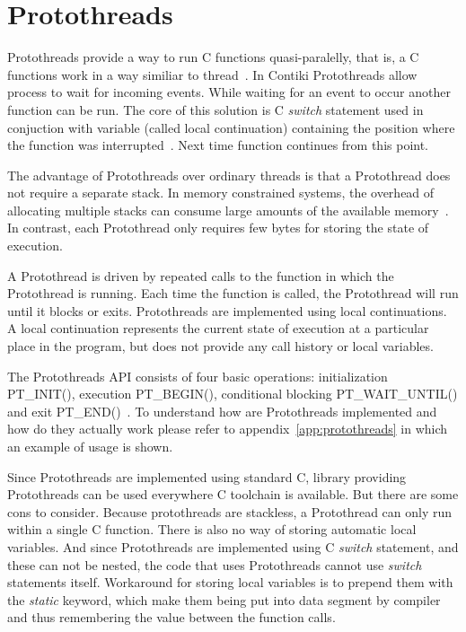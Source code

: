 
\section{Protothreads}\label{sec:contiki-protothreads}
Protothreads provide a way to run C functions quasi-paralelly,
that is, a C functions work in a way similiar to thread~\cite{paper-protothreads}.
In Contiki Protothreads allow process to wait for incoming events.
While waiting for an event to occur another function
can be run. The core of this solution is C {\it switch} statement used in conjuction with variable (called local continuation)
containing the position where the function was interrupted~\cite{paper-protothreads}.
Next time function continues from this point.

The advantage of Protothreads over ordinary threads is that a Protothread does not require a separate stack.
In memory constrained systems, the overhead of allocating multiple stacks can consume large amounts of
the available memory~\cite{paper-protothreads}.
In contrast, each Protothread only requires few bytes for storing the state of execution.

A Protothread is driven by repeated calls to the function in which the Protothread is running.
Each time the
function is called, the Protothread will run until it blocks or exits.
Protothreads are implemented using local continuations. A local continuation represents the current state
of execution at a particular place in the program, but does not provide any call history or local variables.

The Protothreads API consists of four basic operations: initialization PT\_INIT(), execution PT\_BEGIN(),
conditional blocking PT\_WAIT\_UNTIL() and exit PT\_END()~\cite{paper-protothreads}.
To understand how are Protothreads implemented and how do they actually work please refer
to appendix~\ref{app:protothreads} in which an example of usage is shown.

Since Protothreads are implemented using standard C, library providing Protothreads can be used everywhere C toolchain is available.
But there are some cons to consider. Because protothreads are stackless, a Protothread can only run within a single C function.
There is also no way of storing automatic local variables. And since Protothreads are implemented using C {\it switch} statement, and these can
not be nested, the code that uses Protothreads cannot use {\it switch} statements itself.
Workaround for storing local variables is to prepend them with the {\it static} keyword, which make them being put into data segment
by compiler and thus remembering the value between the function calls.
